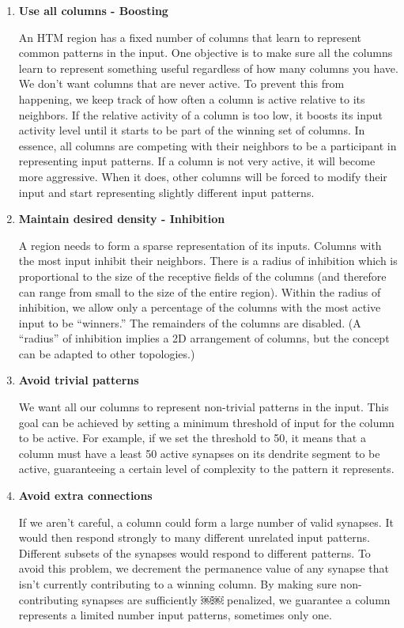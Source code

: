 \begin{enumerate}
\item {\bf Use all columns - Boosting}

An HTM region has a fixed number of columns that learn to represent
common patterns in the input. One objective is to make sure all the
columns learn to represent something useful regardless of how many
columns you have. We don't want columns that are never active. To
prevent this from happening, we keep track of how often a column is
active relative to its neighbors. If the relative activity of a column
is too low, it boosts its input activity level until it starts to be
part of the winning set of columns. In essence, all columns are
competing with their neighbors to be a participant in representing
input patterns. If a column is not very active, it will become more
aggressive. When it does, other columns will be forced to modify their
input and start representing slightly different input patterns.

\item {\bf Maintain desired density - Inhibition}

A region needs to form a sparse representation of its inputs. Columns
with the most input inhibit their neighbors. There is a radius of
inhibition which is proportional to the size of the receptive fields
of the columns (and therefore can range from small to the size of the
entire region). Within the radius of inhibition, we allow only a
percentage of the columns with the most active input to be
``winners.'' The remainders of the columns are disabled. (A ``radius''
of inhibition implies a 2D arrangement of columns, but the concept can
be adapted to other topologies.)

\item {\bf Avoid trivial patterns}

We want all our columns to represent non-trivial patterns in the
input. This goal can be achieved by setting a minimum threshold of
input for the column to be active. For example, if we set the
threshold to 50, it means that a column must have a least 50 active
synapses on its dendrite segment to be active, guaranteeing a certain
level of complexity to the pattern it represents.

\item {\bf Avoid extra connections}

If we aren't careful, a column could form a large number of valid
synapses. It would then respond strongly to many different unrelated
input patterns. Different subsets of the synapses would respond to
different patterns. To avoid this problem, we decrement the permanence
value of any synapse that isn't currently contributing to a winning
column. By making sure non-contributing synapses are sufficiently ￼￼
penalized, we guarantee a column represents a limited number input
patterns, sometimes only one.


\end{enumerate}
